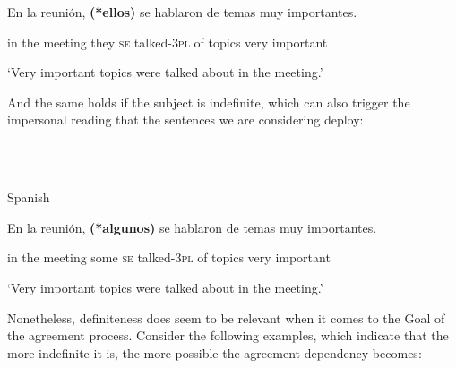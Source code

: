 \documentclass[output=paper]{langsci/langscibook}
\begin{document}
\begin{styleHTMLPreformatted}
En la   reunión, \textbf{(*ellos)}  se   hablaron     de  temas muy importantes.  
\end{styleHTMLPreformatted}

\begin{styleHTMLPreformatted}
  in  the  meeting     they   \textsc{se} talked-\textsc{3pl}  of  topics very important
\end{styleHTMLPreformatted}

\begin{styleHTMLPreformatted}
  ‘Very important topics were talked about in the meeting.’
\end{styleHTMLPreformatted}

\begin{styleHTMLPreformatted}
And the same holds if the subject is indefinite, which can also trigger the impersonal reading that the sentences we are considering deploy:
\end{styleHTMLPreformatted}

\begin{styleHTMLPreformatted}
\ea%
    \label{ex:key:41}
    \gll\\
        \\
    \glt
    \z

           Spanish
\end{styleHTMLPreformatted}

\begin{styleHTMLPreformatted}
En la    reunión, \textbf{(*algunos)} se hablaron   de  temas  muy importantes.
\end{styleHTMLPreformatted}

\begin{styleHTMLPreformatted}
  in   the meeting    some     \textsc{se} talked-\textsc{3pl}   of  topics  very important
\end{styleHTMLPreformatted}

\begin{styleHTMLPreformatted}
  ‘Very important topics were talked about in the meeting.’
\end{styleHTMLPreformatted}

\begin{styleHTMLPreformatted}
Nonetheless, definiteness does seem to be relevant when it comes to the Goal of the agreement process. Consider the following examples, which indicate that the more indefinite it is, the more possible the agreement dependency becomes:
\end{styleHTMLPreformatted}
\end{document}

